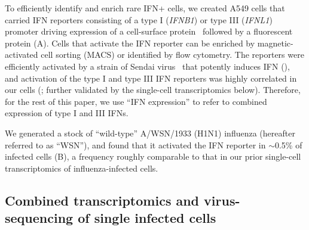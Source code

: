 \documentclass[9pt,lineno]{template}
\begin{document}
To efficiently identify and enrich rare IFN+ cells, we created A549 cells that carried IFN reporters consisting of a type I (\textit{IFNB1}) or type III (\textit{IFNL1}) promoter driving expression of a cell-surface protein~\citep[LNGFR$\Delta$C;][]{bonini1997hsv,ruggieri1997cell} followed by a fluorescent protein (A).
Cells that activate the IFN reporter can be enriched by magnetic-activated cell sorting (MACS) or identified by flow cytometry.
The reporters were efficiently activated by a strain of Sendai virus~\citep{strahle2006sendai} that potently induces IFN (), and activation of the type I and type III IFN reporters was highly correlated in our cells (; further validated by the single-cell transcriptomics below).
Therefore, for the rest of this paper, we use ``IFN expression'' to refer to combined expression of type I and III IFNs. 

We generated a stock of ``wild-type'' A/WSN/1933 (H1N1) influenza (hereafter referred to as ``WSN''), and found that it activated the IFN reporter in $\sim$0.5\% of infected cells  (B), a frequency roughly comparable to that in our prior single-cell transcriptomics of influenza-infected cells.

\subsection{Combined transcriptomics and virus-sequencing of single infected cells}
\end{document}
